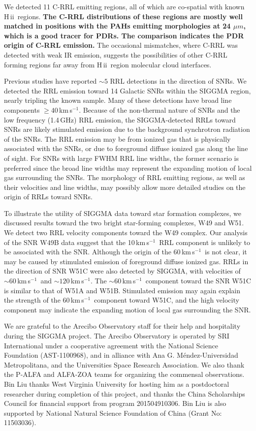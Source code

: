 \documentclass[manuscript]{aastex61}
\newcommand{\hii}{{\rm H\,}{{\sc ii}}}
\newcommand{\kms}{\,km\,s$^{-1}$}
\newcommand{\ghz}{\,GHz}
\newcommand{\um}{\mu m}
\begin{document}
We detected 11 C-RRL emitting regions, all of which are co-spatial with known \hii\ regions.
\textbf{The C-RRL distributions of these regions are mostly well matched in positions with the PAHs emitting morphologies at 24 $\um$, which is a good tracer for PDRs.
The comparison indicates the PDR origin of C-RRL emission.}
The occasional mismatches, where C-RRL was detected with weak IR emission, suggests the possibilities of other C-RRL forming regions far away from \hii\ region molecular cloud interfaces.

Previous studies have reported $\sim5$ RRL detections in the direction of SNRs. 
We detected the RRL emission toward 14 Galactic SNRs within the SIGGMA region, nearly tripling the known sample.
Many of these detections have broad line components $\geq 40$\kms.
Because of the non-thermal nature of SNRs and the low frequency (1.4\ghz) RRL emission, the SIGGMA-detected RRLs toward SNRs are likely stimulated emission due to the background synchrotron radiation of the SNRs.
The RRL emission may be from ionized gas that is physically associated with the SNRs, or due to foreground diffuse ionized gas along the line of sight.
For SNRs with large FWHM RRL line widths, the former scenario is preferred since the broad line widths may represent the expanding motion of local gas surrounding the SNRs.
The morphology of RRL emitting regions, as well as their velocities and line widths, may possibly allow more detailed studies on the origin of RRLs toward SNRs.

To illustrate the utility of SIGGMA data toward star formation complexes, we discussed results toward the two bright star-forming complexes, W49 and W51.
We detect two RRL velocity components toward the W49 complex.  Our analysis of the SNR W49B data suggest that the 10\kms\ RRL component is unlikely to be associated with the SNR.
Although the origin of the 60\kms\ is not clear, it may be caused by stimulated emission of foreground diffuse ionized gas.
RRLs in the direction of SNR W51C were also detected by SIGGMA, with velocities of $\sim60$\kms\ and $\sim120$\kms.
The $\sim60$\kms\ component toward the SNR W51C is similar to that of W51A and W51B.
Stimulated emission may again explain the strength of the 60\kms\ component toward W51C, and
the high velocity component may indicate the expanding motion of local gas surrounding the SNR.

\acknowledgments
We are grateful to the Arecibo Observatory staff for their help and hospitality during the SIGGMA project.
The Arecibo Observatory is operated by SRI International under a cooperative agreement with the National Science
Foundation (AST-1100968), and in alliance with Ana G. M\'endez-Universidad Metropolitana, and the Universities Space Research Association.
We also thank the P-ALFA and ALFA-ZOA teams for organizing the commensal observations. 
Bin Liu thanks West Virginia University for hosting him as a postdoctoral researcher during completion of this project, and thanks the China Scholarships Council for financial support from program 201504910306.
Bin Liu is also supported by National Natural Science Foundation of China (Grant No: 11503036).
\end{document}
